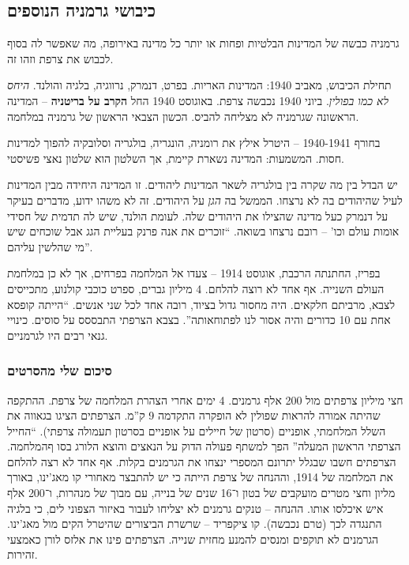 \documentclass[a4paper]{book}
\begin{document}
	
	
	\subsection{כיבושי גרמניה הנוספים}
	
	גרמניה כבשה של המדינות הבלטיות ופחות או יותר כל מדינה באירופה, מה שאפשר לה בסוף לכבוש את צרפת וזהו זה. 
	
	תחילת הכיבוש, מאביב 1940: המדינות האריות. בפרט, דנמרק, נרווגיה, בלגיה והולנד. \textit{היחס לא כמו בפולין}. ביוני 1940 נכבשה צרפת. באוגוסט 1940 החל \textbf{הקרב על בריטניה} – המדינה הראשונה שגרמניה לא מצליחה להביס. הכשון הצבאי הראשון של גרמניה במלחמה. 
	
	בחורף 1940-1941 – היטרל אילץ את רומניה, הונגריה, בולגריה וסלובקיה להפוך למדינות חסות. המשמעות: המדינה נשארת קיימת, אך השלטון הוא שלטון נאצי פשיסטי. 
	
	יש הבדל בין מה שקרה בין בולגריה לשאר המדינות ליהודים. זו המדינה היחידה מבין המדינות לעיל שהיהודים בה לא נרצחו. הממשל בה \textit{הגן} על היהודים. זה לא משהו ידוע, מדברים בעיקר על דנמרק כעל מדינה שהצילו את היהודים שלה. לעומת הולנד, שיש לה תדמית של חסידי אומות עולם וכו' – רובם נרצחו בשואה. ``זוכרים את אנה פרנק בעליית הגג אבל שוכחים שיש מי שהלשין עליהם''. 
	
	בפריז, החתנתה הרכבת, אוגוסט 1914 – צעדו אל המלחמה בפרחים, אך לא כן במלחמת העולם השנייה. אף אחד לא רוצה להלחם. 4 מיליון גברים, ספרט כוכבי קולנוע, מתכייסים לצבא, מרביתם חלקאים. היה מחסור גדול בציוד, רובה אחד לכל שני אנשים. ``הייתה קופסא אחת עם 10 כדורים והיה אסור לנו לפתוחאותה''. בצבא הצרפתי התבססס על סוסים. כינויי גנאי רבים היו לגרמניים. 
	
	\subsubsection{סיכום שלי מהסרטים}
	
	חצי מיליון צרפתים מול 200 אלף גרמנים. 4 ימים אחרי הצהרת המלחמה של צרפת. ההתקפה שהיתה אמורה להראות שפולין לא הופקרה התקדמה 9 ק''מ. הצרפתים הציגו בגאווה את השלל המלחמתי, אופניים (סרטון של חיילים על אופניים בסרטון תעמולה צרפתי). ``החייל הצרפתי הראשון המעלה'' הפך למשתף פעולה הדוק על הנאצים והוצא הלורג בסו ףהמלחמה. הצרפתים חשבו שבגלל יתרונם המספרי ינצחו את הגרמנים בקלות. אף אחד לא רצה להלחם את המלחמה של 1914, וההנחה של צרפת הייתה כי יש להתבצר מאחורי קו מאג'ינו, באורך מליון וחצי מטרים מועקבים של בטון ו־16 שנים של בנייה, עם מבוך של מנהרות, ו־200 אלף איש איכלסו אותו. ההנחה – טנקים גרמנים לא יצליחו לעבור באיזור הצפוני לים, כי בלגיה התנגדה לכך (טרם נכבשה). קו ציקפריד – שרשרת הביצורים שהיטרל הקים מול מאג'ינו. הגרמנים לא תוקפים ומנסים להמנע מחזית שנייה. הצרפתים פינו את אלזס לורן כאמצעי זהירות. 
	
\end{document}
